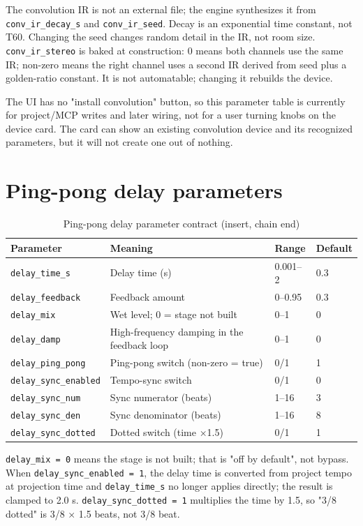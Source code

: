 The convolution IR is not an external file; the engine synthesizes it from \texttt{conv\_ir\_decay\_s} and \texttt{conv\_ir\_seed}. Decay is an exponential time constant, not T60. Changing the seed changes random detail in the IR, not room size. \texttt{conv\_ir\_stereo} is baked at construction: 0 means both channels use the same IR; non-zero means the right channel uses a second IR derived from seed plus a golden-ratio constant. It is not automatable; changing it rebuilds the device.

The UI has no "install convolution" button, so this parameter table is currently for project/MCP writes and later wiring, not for a user turning knobs on the device card. The card can show an existing convolution device and its recognized parameters, but it will not create one out of nothing.

\section{Ping-pong delay parameters}

\begin{table}[htbp]
\centering
\small
\begin{tabular}{@{}llll@{}}
\hline
Parameter & Meaning & Range & Default \\
\hline
\texttt{delay\_time\_s} & Delay time (s) & 0.001–2 & 0.3 \\
\texttt{delay\_feedback} & Feedback amount & 0–0.95 & 0.3 \\
\texttt{delay\_mix} & Wet level; 0 = stage not built & 0–1 & 0 \\
\texttt{delay\_damp} & High-frequency damping in the feedback loop & 0–1 & 0 \\
\texttt{delay\_ping\_pong} & Ping-pong switch (non-zero = true) & 0/1 & 1 \\
\texttt{delay\_sync\_enabled} & Tempo-sync switch & 0/1 & 0 \\
\texttt{delay\_sync\_num} & Sync numerator (beats) & 1–16 & 3 \\
\texttt{delay\_sync\_den} & Sync denominator (beats) & 1–16 & 8 \\
\texttt{delay\_sync\_dotted} & Dotted switch (time ×1.5) & 0/1 & 1 \\
\hline
\end{tabular}
\caption{Ping-pong delay parameter contract (insert, chain end)}
\label{tab:delay-params}
\end{table}

\texttt{delay\_mix = 0} means the stage is not built; that is "off by default", not bypass. When \texttt{delay\_sync\_enabled = 1}, the delay time is converted from project tempo at projection time and \texttt{delay\_time\_s} no longer applies directly; the result is clamped to 2.0 s. \texttt{delay\_sync\_dotted = 1} multiplies the time by 1.5, so "3/8 dotted" is 3/8 × 1.5 beats, not 3/8 beat.

